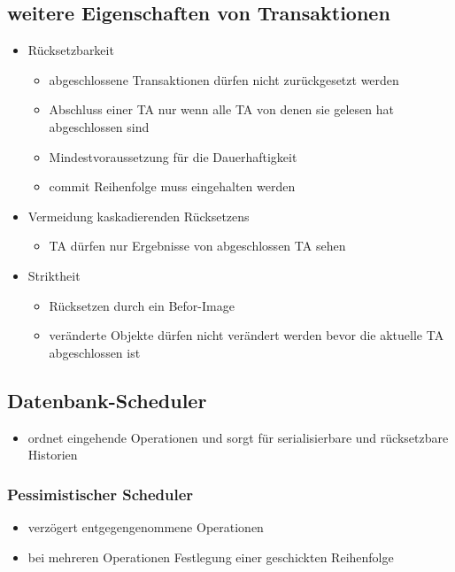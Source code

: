 \documentclass[a4paper]{article}
\begin{document}
\subsection{weitere Eigenschaften von Transaktionen}
\begin{itemize}
    \item Rücksetzbarkeit
    
    \begin{itemize}
        \item abgeschlossene Transaktionen dürfen nicht zurückgesetzt werden
        \item Abschluss einer TA nur wenn alle TA von denen sie gelesen hat abgeschlossen sind
        \item Mindestvoraussetzung für die Dauerhaftigkeit
        \item commit Reihenfolge muss eingehalten werden
    \end{itemize}
    
    \item Vermeidung kaskadierenden Rücksetzens
    
    \begin{itemize}
        \item TA dürfen nur Ergebnisse von abgeschlossen TA sehen
    \end{itemize}
    
    \item Striktheit
    
    \begin{itemize}
        \item Rücksetzen durch ein Befor-Image
        \item veränderte Objekte dürfen nicht verändert werden bevor die aktuelle TA abgeschlossen ist
    \end{itemize}
    
\end{itemize}

\subsection{Datenbank-Scheduler}
\begin{itemize}
    \item ordnet eingehende Operationen und sorgt für serialisierbare und rücksetzbare Historien
\end{itemize}

    \subsubsection{Pessimistischer Scheduler}
    \begin{itemize}
        \item verzögert entgegengenommene Operationen
        \item bei mehreren Operationen Festlegung einer geschickten Reihenfolge
    \end{itemize}
\end{document}
